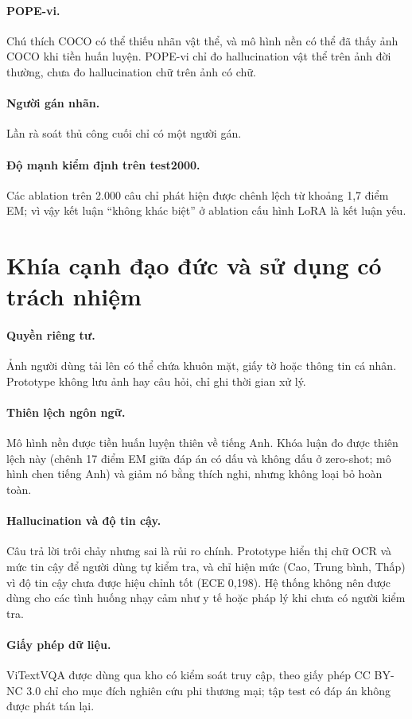\paragraph{POPE-vi.} Chú thích COCO có thể thiếu nhãn vật thể, và mô hình nền có
thể đã thấy ảnh COCO khi tiền huấn luyện. POPE-vi chỉ đo hallucination vật thể
trên ảnh đời thường, chưa đo hallucination chữ trên ảnh có chữ.

\paragraph{Người gán nhãn.} Lần rà soát thủ công cuối chỉ có một người gán.

\paragraph{Độ mạnh kiểm định trên test2000.} Các ablation trên 2.000 câu chỉ phát
hiện được chênh lệch từ khoảng 1,7 điểm EM; vì vậy kết luận ``không khác biệt'' ở
ablation cấu hình LoRA là kết luận yếu.

\section{Khía cạnh đạo đức và sử dụng có trách nhiệm}
\label{sec:dis-ethics}

\paragraph{Quyền riêng tư.} Ảnh người dùng tải lên có thể chứa khuôn mặt, giấy tờ
hoặc thông tin cá nhân. Prototype không lưu ảnh hay câu hỏi, chỉ ghi thời gian xử
lý.

\paragraph{Thiên lệch ngôn ngữ.} Mô hình nền được tiền huấn luyện thiên về tiếng
Anh. Khóa luận đo được thiên lệch này (chênh 17 điểm EM giữa đáp án có dấu và
không dấu ở zero-shot; mô hình chen tiếng Anh) và giảm nó bằng thích nghi, nhưng
không loại bỏ hoàn toàn.

\paragraph{Hallucination và độ tin cậy.} Câu trả lời trôi chảy nhưng sai là rủi ro
chính. Prototype hiển thị chữ OCR và mức tin cậy để người dùng tự kiểm tra, và
chỉ hiện mức (Cao, Trung bình, Thấp) vì độ tin cậy chưa được hiệu chỉnh tốt
(ECE 0,198). Hệ thống không nên được dùng cho các tình huống nhạy cảm như y tế
hoặc pháp lý khi chưa có người kiểm tra.

\paragraph{Giấy phép dữ liệu.} ViTextVQA được dùng qua kho có kiểm soát truy cập,
theo giấy phép CC BY-NC 3.0 chỉ cho mục đích nghiên cứu phi thương mại; tập test
có đáp án không được phát tán lại.
